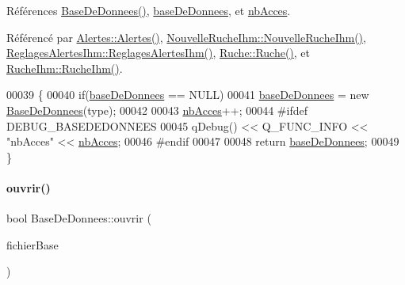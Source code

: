 Références \hyperlink{class_base_de_donnees_a10dd177f1008f675ab78c2221b2a6750}{Base\+De\+Donnees()}, \hyperlink{class_base_de_donnees_a822ba0b7cf85b1e48ced8efd3d65e266}{base\+De\+Donnees}, et \hyperlink{class_base_de_donnees_a5099ecb2922bb31d84cd5d4505298a29}{nb\+Acces}.



Référencé par \hyperlink{class_alertes_ad2e4e3907f97bdd06840dfeee0a87ddb}{Alertes\+::\+Alertes()}, \hyperlink{class_nouvelle_ruche_ihm_a338b9af0b96ed0839a8d5008c8c89cc4}{Nouvelle\+Ruche\+Ihm\+::\+Nouvelle\+Ruche\+Ihm()}, \hyperlink{class_reglages_alertes_ihm_ae6337f2d05a3184e48bf5022a91f06c7}{Reglages\+Alertes\+Ihm\+::\+Reglages\+Alertes\+Ihm()}, \hyperlink{class_ruche_a8b4ee3752d984c5acee93b990db7939a}{Ruche\+::\+Ruche()}, et \hyperlink{class_ruche_ihm_a04c2544ba4e9cca6c38f553c32d63dee}{Ruche\+Ihm\+::\+Ruche\+Ihm()}.


\begin{DoxyCode}
00039 \{
00040     \textcolor{keywordflow}{if}(\hyperlink{class_base_de_donnees_a822ba0b7cf85b1e48ced8efd3d65e266}{baseDeDonnees} == NULL)
00041         \hyperlink{class_base_de_donnees_a822ba0b7cf85b1e48ced8efd3d65e266}{baseDeDonnees} = \textcolor{keyword}{new} \hyperlink{class_base_de_donnees_a10dd177f1008f675ab78c2221b2a6750}{BaseDeDonnees}(type);
00042 
00043     \hyperlink{class_base_de_donnees_a5099ecb2922bb31d84cd5d4505298a29}{nbAcces}++;
00044 \textcolor{preprocessor}{    #ifdef DEBUG\_BASEDEDONNEES}
00045     qDebug() << Q\_FUNC\_INFO << \textcolor{stringliteral}{"nbAcces"} << \hyperlink{class_base_de_donnees_a5099ecb2922bb31d84cd5d4505298a29}{nbAcces};
00046 \textcolor{preprocessor}{    #endif}
00047 
00048     \textcolor{keywordflow}{return} \hyperlink{class_base_de_donnees_a822ba0b7cf85b1e48ced8efd3d65e266}{baseDeDonnees};
00049 \}
\end{DoxyCode}
\mbox{\label{class_base_de_donnees_a7f6a5510b08017b0d99115a84252f186}} 
\paragraph{\texorpdfstring{ouvrir()}{ouvrir()}}
{\footnotesize\ttfamily bool Base\+De\+Donnees\+::ouvrir (\begin{DoxyParamCaption}\item[{Q\+String}]{fichier\+Base }\end{DoxyParamCaption})}



